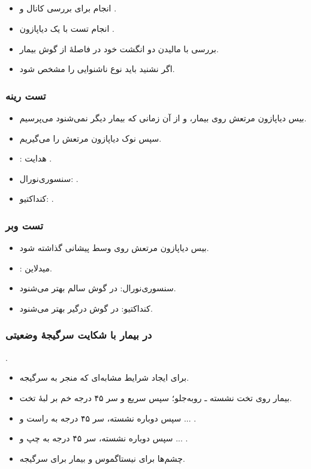 \documentclass[a4paper,12pt]{extbook}
\begin{document}
\subsection*{}
\begin{itemize}
\item انجام  برای بررسی کانال و .
\item انجام تست  با یک دیاپازون .
\item بررسی  با مالیدن دو انگشت خود در فاصلهٔ \NEen{5cm} از گوش بیمار.
\item اگر نشنید باید نوع ناشنوایی را مشخص شود.
\end{itemize}
\subsubsection*{تست رینه}
\begin{itemize}
\item بیس دیاپازون مرتعش روی  بیمار، و از آن زمانی که بیمار دیگر نمی‌شنود می‌پرسیم.
\item سپس نوک دیاپازون مرتعش را  می‌گیریم.
\item {}: هدایت .
\item سنسوری‌نورال: .
\item کنداکتیو: .
\end{itemize}
\subsubsection*{تست وبر}
\begin{itemize}
\item بیس دیاپازون مرتعش روی وسط پیشانی گذاشته شود.
\item {}: میدلاین.
\item سنسوری‌نورال: در گوش سالم بهتر می‌شنود.
\item کنداکتیو: در گوش درگیر بهتر می‌شنود.
\end{itemize}
\subsubsection*{در بیمار با شکایت سرگیجهٔ وضعیتی}
 .
\begin{itemize}
\item برای ایجاد شرایط مشابه‌ای که منجر به سرگیجه.
\item بیمار روی تخت نشسته ـ روبه‌جلو؛ سپس سریع  و سر ۴۵ درجه خم بر لبهٔ تخت.
\item سپس دوباره نشسته، سر ۴۵ درجه به راست و ... .
\item سپس دوباره نشسته، سر ۴۵ درجه به چپ و ... .
\item چشم‌ها برای نیستاگموس و بیمار برای سرگیجه.
\end{itemize}
\end{document}
